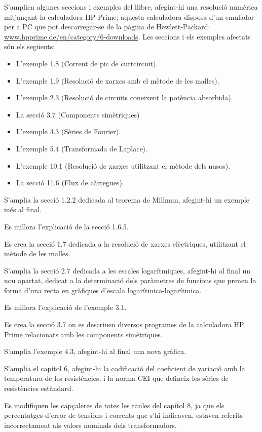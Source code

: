 S'amplien algunes seccions i exemples del llibre, afegint-hi una  resolució numèrica mitjançant la calculadora \textsf{HP Prime};  aquesta calculadora disposa d'un emulador per a PC que pot descarregar-se de la pàgina de Hewlett-Packard: \href{http://www.hpprime.de/en/category/6-downloads}{www.hpprime.de/en/category/6-downloads}. Les seccions i els exemples afectats són els següents:
\begin{itemize}
  \item L'exemple 1.8  (Corrent de pic de curtcircuit).
  \item L'exemple 1.9 (Resolució de xarxes amb el mètode de les malles).
  \item L'exemple 2.3 (Resolució de circuits coneixent la potència absorbida).
  \item La secció 3.7 (Components simètriques)
  \item L'exemple 4.3 (Sèries de Fourier).
  \item L'exemple 5.4 (Transformada de Laplace).
  \item L'exemple 10.1 (Resolució de xarxes utilitzant el mètode dels nusos).
  \item La secció 11.6 (Flux de càrregues).
\end{itemize}

S'amplia la secció 1.2.2 dedicada al teorema de Millman, afegint-hi un exemple més al final.

Es millora l'explicació de la secció 1.6.5.

Es crea la secció 1.7 dedicada a la resolució de xarxes elèctriques, utilitzant el mètode de les malles.

S'amplia la secció 2.7 dedicada a les escales logarítmiques, afegint-hi al final un nou apartat, dedicat a la determinació dels paràmetres de funcions que prenen la forma d'una recta en gràfiques d'escala logarítmica-logarítmica.

Es millora l'explicació de l'exemple 3.1.

Es crea la secció 3.7 on es descriuen diversos programes de la calculadora
\textsf{HP Prime} relacionats amb les components simètriques.

S'amplia l'exemple 4.3, afegint-hi al final  una nova gràfica.

S'amplia el capítol 6, afegint-hi la codificació del coeficient de variació amb la temperatura de les resistències, i la norma CEI que defineix les sèries de resistències estàndard.

Es modifiquen les capçaleres de totes les taules del capítol 8, ja que els percentatges d'error de tensions i corrents que s'hi indicaven, estaven referits incorrectament als valors nominals dels transformadors.

